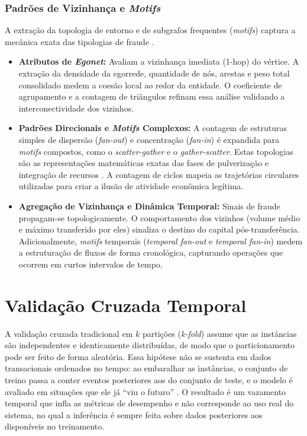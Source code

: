 \documentclass[titlepage,a4paper,oneside,onecolumn,12pt]{report}
\begin{document}
\subsubsection{Padrões de Vizinhança e \textit{Motifs}}
A extração da topologia de entorno e de subgrafos frequentes (\textit{motifs}) captura a mecânica exata das tipologias de fraude \cite{akoglu2010oddball, mitchell2019effectiveness}.
\begin{itemize}

\item \textbf{Atributos de \textit{Egonet}:} Avaliam a vizinhança imediata (1-hop) do vértice. A extração da densidade da egorrede, quantidade de nós, arestas e peso total consolidado medem a coesão local ao redor da entidade. O coeficiente de agrupamento e a contagem de triângulos refinam essa análise validando a interconectividade dos vizinhos.

\item \textbf{Padrões Direcionais e \textit{Motifs} Complexos:} A contagem de estruturas simples de dispersão (\textit{fan-out}) e concentração (\textit{fan-in}) é expandida para \textit{motifs} compostos, como o \textit{scatter-gather} e o \textit{gather-scatter}. Estas topologias são as representações matemáticas exatas das fases de pulverização e integração de recursos \cite{weber2019anti}. A contagem de ciclos mapeia as trajetórias circulares utilizadas para criar a ilusão de atividade econômica legítima.

\item \textbf{Agregação de Vizinhança e Dinâmica Temporal:} Sinais de fraude propagam-se topologicamente. O comportamento dos vizinhos (volume médio e máximo transferido por eles) sinaliza o destino do capital pós-transferência. Adicionalmente, \textit{motifs} temporais (\textit{temporal fan-out} e \textit{temporal fan-in}) medem a estruturação de fluxos de forma cronológica, capturando operações que ocorrem em curtos intervalos de tempo.

\end{itemize}

\section{Validação Cruzada Temporal}
\label{sec:validacao_temporal}

A validação cruzada tradicional em $k$ partições (\textit{k-fold}) assume que as instâncias são independentes e identicamente distribuídas, de modo que o particionamento pode ser feito de forma aleatória. Essa hipótese não se sustenta em dados transacionais ordenados no tempo: ao embaralhar as instâncias, o conjunto de treino passa a conter eventos posteriores aos do conjunto de teste, e o modelo é avaliado em situações que ele já ``viu o futuro'' \cite{sizan2025machine}. O resultado é um vazamento temporal que infla as métricas de desempenho e não corresponde ao uso real do sistema, no qual a inferência é sempre feita sobre dados posteriores aos disponíveis no treinamento.
\end{document}

